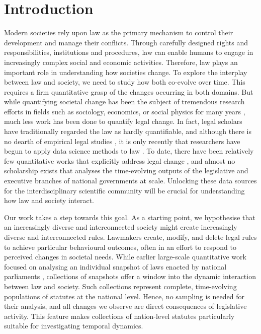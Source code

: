 
\section{Introduction}
\label{section:introduction}

Modern societies rely upon law as the primary mechanism to control their development and manage their conflicts. 
Through carefully designed rights and responsibilities, institutions and procedures,
law can enable humans to engage in increasingly complex social and economic activities. 
Therefore, law plays an important role in understanding how societies change. 
To explore the interplay between law and society, 
we need to study how both co-evolve over time. 
This requires a firm quantitative grasp of the changes occurring in both domains. 
But while quantifying societal change has been the subject of tremendous research efforts in fields such as sociology, economics, or social physics for many years \cite{bowers1937,bogue1952,tuma1984,palla2007,castellano2009,ebrahim2019},
much less work has been done to quantify legal change. 
In fact, legal scholars have traditionally regarded the law as hardly quantifiable, 
and although there is no dearth of empirical legal studies \cite{heise2011,ho2013,epstein2014}, 
it is only recently that researchers have begun to apply data science methods to law \cite{whalen2016,coupette2019,livermore2019,frankenreiter2020}.
To date, there have been relatively few quantitative works that explicitly address legal change \cite{cross2007,buchanan2014,rockmore2017,ruhl2017,rutherford2018,fjelstul2019}, 
and almost no scholarship exists that analyses the time-evolving outputs of the legislative and executive branches of national governments at scale. 
Unlocking these data sources for the interdisciplinary scientific community will be crucial for understanding how law and society interact.

Our work takes a step towards this goal.
As a starting point, we hypothesise that an increasingly diverse and interconnected society might create increasingly diverse and interconnected rules. 
Lawmakers create, modify, and delete legal rules to achieve particular behavioural outcomes, often in an effort to respond to perceived changes in societal needs.
While earlier large-scale quantitative work focused on analysing an individual snapshot of laws enacted by national parliaments \cite{bommarito2010a,katz2014},
collections of snapshots offer a window into the dynamic interaction between law and society.
Such collections represent complete, time-evolving populations of statutes at the national level. 
Hence, no sampling is needed for their analysis, 
and all changes we observe are direct consequences of legislative activity.
This feature makes collections of nation-level statutes particularly suitable for investigating temporal dynamics.

